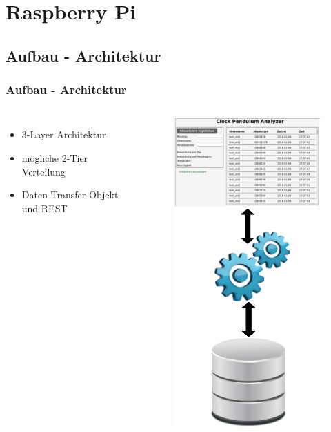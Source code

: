 \section{Raspberry Pi}
\begin{frame}
\end{frame}

\subsection{Aufbau - Architektur}
\begin{frame}
    \frametitle{Aufbau - Architektur}
    \begin{columns}[c] %
        \begin{itemize}
            \item<1->3-Layer Architektur
            \item<1->mögliche 2-Tier Verteilung
            \item<1->Daten-Transfer-Objekt und REST
        \end{itemize}
        \begin{figure}
            \centering
            \begin{overprint}
                \includegraphics[width=.5\textwidth]{3layer.png}

\end{overprint}
\end{figure}
\end{columns}
\end{frame}
